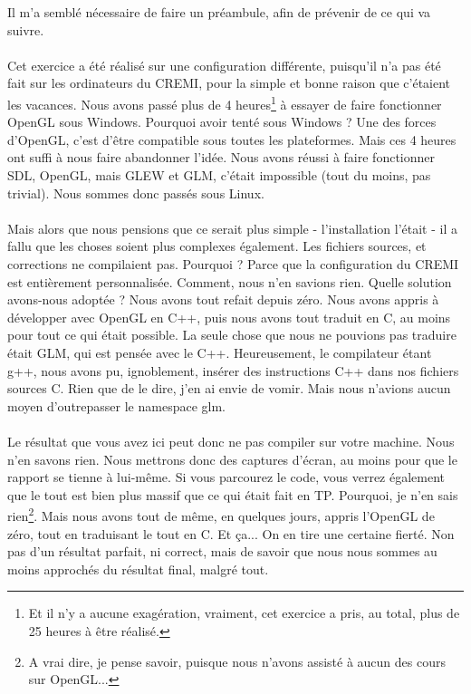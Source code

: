 Il m'a semblé nécessaire de faire un préambule, afin de prévenir de ce qui va suivre.
\\\\
Cet exercice a été réalisé sur une configuration différente, puisqu'il n'a pas été fait sur les ordinateurs du CREMI, pour la simple et bonne raison que c'étaient les vacances. Nous avons passé plus de 4 heures\footnote{Et il n'y a aucune exagération, vraiment, cet exercice a pris, au total, plus de 25 heures à être réalisé.} à essayer de faire fonctionner OpenGL sous Windows. Pourquoi avoir tenté sous Windows ? Une des forces d'OpenGL, c'est d'être compatible sous toutes les plateformes. Mais ces 4 heures ont suffi à nous faire abandonner l'idée. Nous avons réussi à faire fonctionner SDL, OpenGL, mais GLEW et GLM, c'était impossible (tout du moins, pas trivial). Nous sommes donc passés sous Linux.
\\\\
Mais alors que nous pensions que ce serait plus simple - l'installation l'était - il a fallu que les choses soient plus complexes également. Les fichiers sources, et corrections ne compilaient pas. Pourquoi ? Parce que la configuration du CREMI est entièrement personnalisée. Comment, nous n'en savions rien. Quelle solution avons-nous adoptée ? Nous avons tout refait depuis zéro. Nous avons appris à développer avec OpenGL en C++, puis nous avons tout traduit en C, au moins pour tout ce qui était possible. La seule chose que nous ne pouvions pas traduire était GLM, qui est pensée avec le C++. Heureusement, le compilateur étant g++, nous avons pu, ignoblement, insérer des instructions C++ dans nos fichiers sources C. Rien que de le dire, j'en ai envie de vomir. Mais nous n'avions aucun moyen d'outrepasser le namespace glm.
\\\\
Le résultat que vous avez ici peut donc ne pas compiler sur votre machine. Nous n'en savons rien. Nous mettrons donc des captures d'écran, au moins pour que le rapport se tienne à lui-même. Si vous parcourez le code, vous verrez également que le tout est bien plus massif que ce qui était fait en TP. Pourquoi, je n'en sais rien\footnote{A vrai dire, je pense savoir, puisque nous n'avons assisté à aucun des cours sur OpenGL...}. Mais nous avons tout de même, en quelques jours, appris l'OpenGL de zéro, tout en traduisant le tout en C. Et ça... On en tire une certaine fierté. Non pas d'un résultat parfait, ni correct, mais de savoir que nous nous sommes au moins approchés du résultat final, malgré tout.